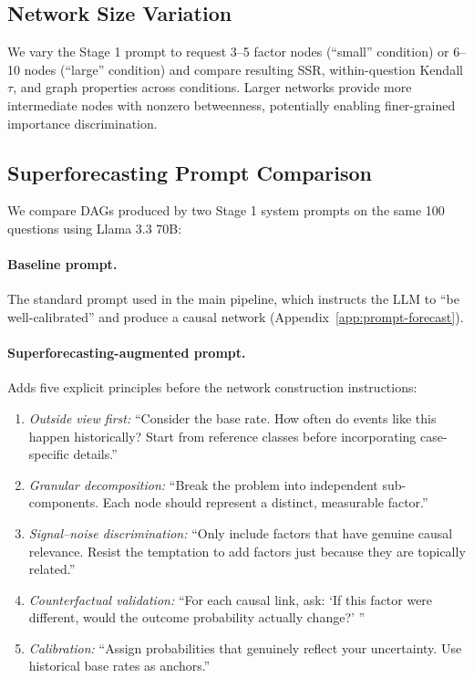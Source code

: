 \documentclass[11pt]{article}
\begin{document}
\subsection{Network Size Variation}

We vary the Stage 1 prompt to request 3--5 factor nodes (``small'' condition) or 6--10 nodes (``large'' condition) and compare resulting SSR, within-question Kendall $\tau$, and graph properties across conditions. Larger networks provide more intermediate nodes with nonzero betweenness, potentially enabling finer-grained importance discrimination.

\subsection{Superforecasting Prompt Comparison}

We compare DAGs produced by two Stage 1 system prompts on the same 100 questions using Llama 3.3 70B:

\paragraph{Baseline prompt.} The standard prompt used in the main pipeline, which instructs the LLM to ``be well-calibrated'' and produce a causal network (Appendix~\ref{app:prompt-forecast}).

\paragraph{Superforecasting-augmented prompt.} Adds five explicit principles before the network construction instructions:
\begin{enumerate}
\small
\item \textit{Outside view first:} ``Consider the base rate. How often do events like this happen historically? Start from reference classes before incorporating case-specific details.''
\item \textit{Granular decomposition:} ``Break the problem into independent sub-components. Each node should represent a distinct, measurable factor.''
\item \textit{Signal--noise discrimination:} ``Only include factors that have genuine causal relevance. Resist the temptation to add factors just because they are topically related.''
\item \textit{Counterfactual validation:} ``For each causal link, ask: `If this factor were different, would the outcome probability actually change?' ''
\item \textit{Calibration:} ``Assign probabilities that genuinely reflect your uncertainty. Use historical base rates as anchors.''
\end{enumerate}
\end{document}
